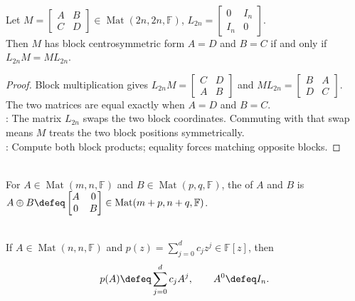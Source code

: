 \begin{proposition} \label{prop:block-centrosymmetric-commutation} \\
Let $M=
\begin{bmatrix}
A & B\\
C & D
\end{bmatrix}\in\operatorname{Mat}(2n,2n,\mathbb{F})$,
$L_{2n}=
\begin{bmatrix}
0 & I_n\\
I_n & 0
\end{bmatrix}$.\\
Then $M$ has block centrosymmetric form $A=D$ and $B=C$ if and only if $L_{2n}M=ML_{2n}$.
\begin{proof}
Block multiplication gives $L_{2n}M=
\begin{bmatrix}
C & D\\
A & B
\end{bmatrix}$ and 
$ML_{2n}=
\begin{bmatrix}
B & A\\
D & C
\end{bmatrix}$.\\
The two matrices are equal exactly when $A=D$ and $B=C$.\\
: The matrix $L_{2n}$ swaps the two block coordinates. Commuting with that swap means $M$ treats the two block positions symmetrically.\\
: Compute both block products; equality forces matching opposite blocks.
\end{proof}
\end{proposition}

\begin{definition} \\
For $A\in\operatorname{Mat}(m,n,\mathbb{F})$ and $B\in\operatorname{Mat}(p,q,\mathbb{F})$, the  of $A$ and $B$ is $A\oplus B\defeq
\begin{bmatrix}
A & 0\\
0 & B
\end{bmatrix}
\in\operatorname{Mat}(m+p,n+q,\mathbb{F})$.
\end{definition}

\begin{definition} \label{def:polynomial-evaluation-on-square-matrix} \\
If $A\in\operatorname{Mat}(n,n,\mathbb{F})$ and $p(z)=\sum\limits_{j=0}^d c_jz^j\in\mathbb{F}[z]$, then
\[
p(A)\defeq\sum\limits_{j=0}^d c_jA^j,
\qquad A^0\defeq I_n.
\]
\end{definition}

